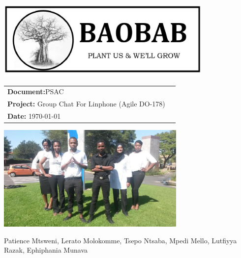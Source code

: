 \begin{titlepage}

\begin{center}

\includegraphics[width=400px]{pictures/logo.jpg}
\vspace{0.5 cm}
\begin{flushright} \large
\begin{tabular}{lr}
\vspace{1 cm}
\LARGE\textbf{Document:}PSAC\\

\vspace{1 cm}
\LARGE\textbf{Project:} Group Chat For Linphone (Agile DO-178)\\
\LARGE\textbf{Date: }\today\\
\end{tabular}
\end{flushright}

\centering \includegraphics[width=350px]{pictures/Team.jpg}

Patience Mtsweni, Lerato Molokomme, Tsepo Ntsaba, Mpedi Mello, Lutfiyya Razak, Ephiphania Munava\\


\end{center}
\end{titlepage}